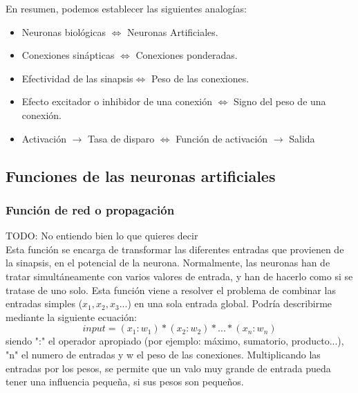 En resumen, podemos establecer las siguientes analogías:
\begin{itemize}
\item Neuronas biológicas $\Longleftrightarrow$ Neuronas Artificiales.
\item Conexiones sinápticas $\Longleftrightarrow$ Conexiones ponderadas.
\item Efectividad de las sinapsis$\Longleftrightarrow$ Peso de las conexiones.
\item Efecto excitador o inhibidor de una conexión $\Longleftrightarrow$ Signo del peso de una
conexión.
\item Activación $\rightarrow$ Tasa de disparo $\Longleftrightarrow$ Función de activación $\rightarrow$ Salida
\end{itemize}

\subsection {Funciones de las neuronas artificiales}
\subsubsection {Función de red o propagación}
TODO: No entiendo bien lo que quieres decir\\
Esta función se encarga de transformar las diferentes entradas que provienen de la sinapsis, en el potencial de la neurona. Normalmente, las neuronas han de tratar simultáneamente con varios valores de entrada, y han de hacerlo como si se tratase de uno solo. Esta función viene a resolver el problema de combinar las entradas simples (${x_{1},x_{2},x_{3}...}$) en una sola entrada global. Podría describirme mediante la siguiente ecuación:
\begin{equation}
input = (x_{1}:w_{1})*(x_{2}:w_{2})*...*(x_{n}:w_{n})
\end{equation}
siendo ":" el operador apropiado (por ejemplo: máximo, sumatorio, producto...), "n" el numero de entradas y w el peso de las conexiones. Multiplicando las entradas por los pesos, se permite que un valo muy grande de entrada pueda tener una influencia pequeña, si sus pesos son pequeños.
